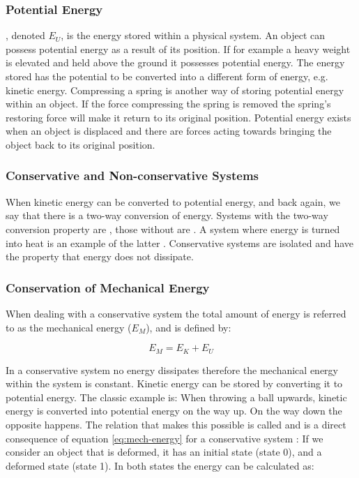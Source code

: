 \subsubsection{Potential Energy}
, denoted $E_U$, is the energy stored within a
physical system. An
object can possess potential energy as a result of its position. If for
example a heavy weight is elevated and held above the ground it
possesses potential energy. The energy stored has the potential to be
converted into a different form of energy, e.g. kinetic
energy. Compressing a spring is another way of storing potential
energy within an object. If the force compressing the spring is
removed the spring's restoring force will make it return to its
original position. Potential energy exists when an object 
is displaced and there are forces acting towards bringing
the object back to its original position. 
%

\subsubsection{Conservative and Non-conservative Systems}
When kinetic energy can be converted to potential energy, and back
again, we say that there is a two-way conversion of energy. Systems
with the two-way conversion property are ,
those without are . A system where
energy is turned into heat is an example of the latter
.
Conservative systems are isolated and have the property that energy
does not dissipate.

\subsubsection{Conservation of Mechanical Energy}
\label{sec:conser-of-me}
When dealing with a conservative system the total amount of
energy is referred to as the mechanical energy ($E_M$), and is defined
by:

\begin{equation}
\label{eq:mech-energy}
E_M = E_K + E_U
\end{equation}

In a conservative system no energy dissipates therefore the mechanical
energy within the system is constant.
Kinetic energy can be stored by converting it to potential energy. The
classic example is: When throwing a ball upwards, kinetic energy is
converted into potential energy on the way up. On the way down the
opposite happens. The relation that makes this possible is called 
 and is a direct consequence
of equation \eqref{eq:mech-energy} for a conservative system
:
%
If we consider an object that is deformed, it has an initial state
(state 0), and a deformed state (state 1). In both states the energy
can be calculated as:

